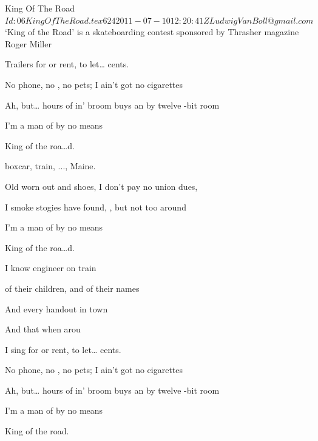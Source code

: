 \begin{SBSong}{King Of The Road}
  {$Id: 06KingOfTheRoad.tex 624 2011-07-10 12:20:41Z LudwigVanBoll@gmail.com $}
  {`King of the Road' is a skateboarding contest sponsored by Thrasher magazine}
  {Roger Miller}
  \begin{SBVerse}
    Trailers for  or rent,  to let\ldots {} cents.

    No phone, no , no pets;   I ain't got no cigarettes

    Ah, but\ldots {} hours of in' broom buys an  by twelve -bit room

    I'm a man of  by no means    

    King of the roa\ldots d.
  \end{SBVerse}
  \begin{SBVerse}
     boxcar,  train, ..., Maine.

    Old worn out  and shoes,   I don't pay no union dues,

    I smoke  stogies  have found, , but not too  around

    I'm a man of  by no means    

    King of the roa\ldots d.
  \end{SBVerse}
  \begin{SBVerse}
    I know  engineer on  train

     of their children, and  of their names

    And every handout in  town

    And   that   when   arou 
  \end{SBVerse}
  \begin{SBVerse}
    I sing  for  or rent,  to let\ldots {} cents.

    No phone, no , no pets;   I ain't got no cigarettes

    Ah, but\ldots {} hours of in' broom buys an  by twelve -bit room

    I'm a man of  by no means 

      King of the road.
  \end{SBVerse}
\end{SBSong}
